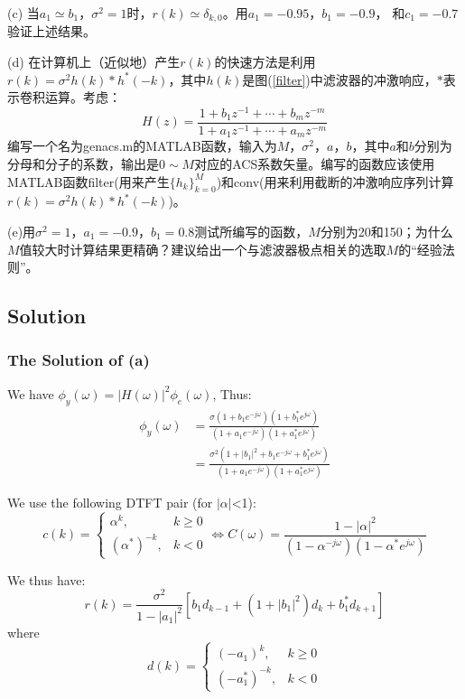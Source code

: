 \documentclass[UTF-8, a4paper, 12pt]{ctexart}
\begin{document}
(c) 当$a_1 \simeq b_1$，$\sigma^2=1$时，$r(k)\simeq \delta_{k,0}$。用$a_1=-0.95$，$b_1=-0.9$， 和$c_1=-0.7$验证上述结果。

(d) 在计算机上（近似地）产生$r(k)$的快速方法是利用$r(k)=\sigma^2h(k)*h^*(-k)$，其中$h(k)$是图(\ref{filter})中滤波器的冲激响应，$*$表示卷积运算。考虑：
\begin{equation}
    H(z)=\frac{1+b_1z^{-1}+\cdots+b_mz^{-m}}{1+a_1z^{-1}+\cdots+a_mz^{-m}}
\end{equation}
编写一个名为genacs.m的MATLAB函数，输入为$M$，$\sigma^2$，$a$，$b$，其中$a$和$b$分别为分母和分子的系数，输出是$0\sim M$对应的ACS系数矢量。编写的函数应该使用MATLAB函数filter(用来产生$\{h_k\}^M_{k=0}$)和conv(用来利用截断的冲激响应序列计算$r(k)=\sigma^2h(k)*h^*(-k)$)。

(e)用$\sigma^2=1$，$a_1=-0.9$，$b_1=0.8$测试所编写的函数，$M$分别为20和150；为什么$M$值较大时计算结果更精确？建议给出一个与滤波器极点相关的选取$M$的“经验法则”。
\subsection{Solution}

\subsubsection{The Solution of (a)}
We have $\phi_y(\omega)=|H(\omega)|^2\phi_e(\omega)$, Thus:
\begin{align}
     \phi_y(\omega) & = \frac{\sigma(1+b_1e^{-j\omega})(1+b_1^*e^{j\omega})}{(1+a_1e^{-j\omega})(1+a_1^*e^{j\omega})}   \\
     &=\frac{\sigma^2(1+|b_1|^2+b_1e^{-j\omega}+b_1^*e^{j\omega})}{(1+a_1e^{-j\omega})(1+a_1^*e^{j\omega})}
\end{align}

We use the following DTFT pair (for $|\alpha|$<1):
\begin{equation}
    c(k)=\left\{\begin{array}{ll}
        \alpha^k,& k\geq 0\\
        (\alpha^*)^{-k},&k<0
    \end{array}\right.\Longleftrightarrow C(\omega)=\frac{1-|\alpha|^2}{(1-\alpha^{-j\omega})(1-\alpha^*e^{j\omega})}
\end{equation}

We thus have:
\begin{equation}
    r(k)=\frac{\sigma^2}{1-|a_1|^2}\left[b_1d_{k-1}+(1+|b_1|^2)d_k+b_1^*d_{k+1}\right]
\end{equation}
where
\begin{equation}
    d(k)=\left\{\begin{array}{ll}
        (-a_1)^k,&k\geq0\\
        (-a_1^*)^{-k},&k<0
    \end{array} \right.
\end{equation}
\end{document}

